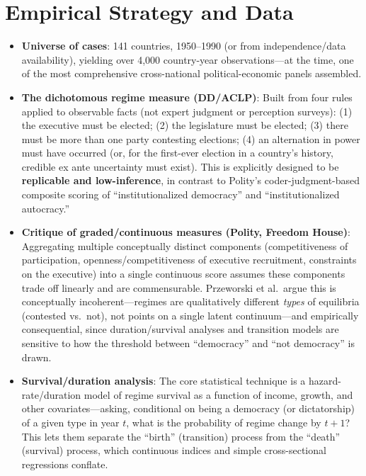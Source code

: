 \documentclass[12pt]{article}
\begin{document}
\section{Empirical Strategy and Data}

\begin{itemize}[leftmargin=*, itemsep=4pt]
    \item \textbf{Universe of cases}: 141 countries, 1950--1990 (or from independence/data availability), yielding over 4,000 country-year observations---at the time, one of the most comprehensive cross-national political-economic panels assembled.
    \item \textbf{The dichotomous regime measure (DD/ACLP)}: Built from four rules applied to observable facts (not expert judgment or perception surveys): (1) the executive must be elected; (2) the legislature must be elected; (3) there must be more than one party contesting elections; (4) an alternation in power must have occurred (or, for the first-ever election in a country's history, credible ex ante uncertainty must exist). This is explicitly designed to be \textbf{replicable and low-inference}, in contrast to Polity's coder-judgment-based composite scoring of ``institutionalized democracy'' and ``institutionalized autocracy.''
    \item \textbf{Critique of graded/continuous measures (Polity, Freedom House)}: Aggregating multiple conceptually distinct components (competitiveness of participation, openness/competitiveness of executive recruitment, constraints on the executive) into a single continuous score assumes these components trade off linearly and are commensurable. Przeworski et al.\ argue this is conceptually incoherent---regimes are qualitatively different \textit{types} of equilibria (contested vs.\ not), not points on a single latent continuum---and empirically consequential, since duration/survival analyses and transition models are sensitive to how the threshold between ``democracy'' and ``not democracy'' is drawn.
    \item \textbf{Survival/duration analysis}: The core statistical technique is a hazard-rate/duration model of regime survival as a function of income, growth, and other covariates---asking, conditional on being a democracy (or dictatorship) of a given type in year $t$, what is the probability of regime change by $t+1$? This lets them separate the ``birth'' (transition) process from the ``death'' (survival) process, which continuous indices and simple cross-sectional regressions conflate.

\end{itemize}
\end{document}
